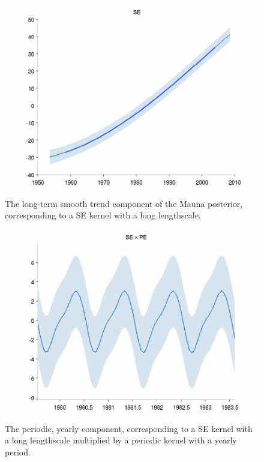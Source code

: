 \documentclass[twoside]{article}
\theoremstyle{definition}
\theoremstyle{remark}
\numberwithin{equation}{section}
\numberwithin{thm}{section}
\begin{document}
\begin{figure}
\includegraphics[width=\columnwidth]{../figures/decomposition/mauna_test_1}
\caption{The long-term smooth trend component of the Mauna posterior, corresponding to a SE kernel with a long lengthscale.}
\label{fig:mauna_decomp1}
\end{figure}

\begin{figure}
\includegraphics[width=\columnwidth]{../figures/decomposition/mauna_test_2_zoom}
\caption{The periodic, yearly component, corresponding to a SE kernel with a long lengthscale multiplied by a periodic kernel with a yearly period.}
\label{fig:mauna_decomp2}
\end{figure}
\end{document}
